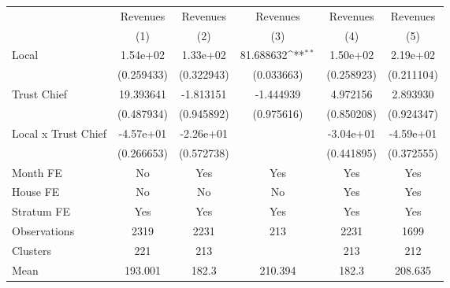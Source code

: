 {
\def\sym#1{\ifmmode^{#1}\else\(^{#1}\)\fi}
\begin{tabular}{l*{5}{c}}
\toprule
                &\multicolumn{1}{c}{Revenues}&\multicolumn{1}{c}{Revenues}&\multicolumn{1}{c}{Revenues}&\multicolumn{1}{c}{Revenues}&\multicolumn{1}{c}{Revenues}\\
                &\multicolumn{1}{c}{(1)}         &\multicolumn{1}{c}{(2)}         &\multicolumn{1}{c}{(3)}         &\multicolumn{1}{c}{(4)}         &\multicolumn{1}{c}{(5)}         \\
\midrule
Local           & 1.54e+02         & 1.33e+02         &81.688632\sym{**} & 1.50e+02         & 2.19e+02         \\
                &(0.259433)         &(0.322943)         &(0.033663)         &(0.258923)         &(0.211104)         \\
Trust Chief     &19.393641         &-1.813151         &-1.444939         & 4.972156         & 2.893930         \\
                &(0.487934)         &(0.945892)         &(0.975616)         &(0.850208)         &(0.924347)         \\
Local x Trust Chief&-4.57e+01         &-2.26e+01         &                  &-3.04e+01         &-4.59e+01         \\
                &(0.266653)         &(0.572738)         &                  &(0.441895)         &(0.372555)         \\
Month FE        &       No         &      Yes         &      Yes         &      Yes         &      Yes         \\
House FE        &       No         &       No         &       No         &      Yes         &      Yes         \\
Stratum FE      &      Yes         &      Yes         &      Yes         &      Yes         &      Yes         \\
\midrule
Observations    &     2319         &     2231         &      213         &     2231         &     1699         \\
Clusters        &      221         &      213         &                  &      213         &      212         \\
Mean            &  193.001         &    182.3         &  210.394         &    182.3         &  208.635         \\
\bottomrule
\end{tabular}
}
